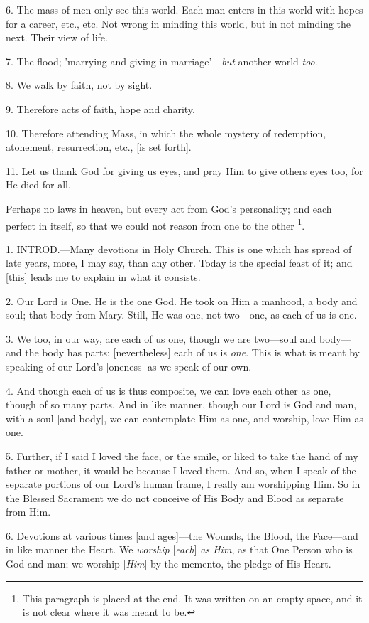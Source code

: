 6. The mass of men only see this world. Each
man enters in this world with hopes for a career, etc., etc. Not
wrong in minding this world, but in not minding the next. Their view
of life.

7. The flood; 'marrying and giving in
marriage'—\emph{but} another world \emph{too}.

8. We walk by faith, not by sight.

9. Therefore acts of faith, hope and charity.

10. Therefore attending Mass, in which the whole
mystery of redemption, atonement, resurrection, etc., [is set forth].

11. Let us thank God for giving us eyes, and pray
Him to give others eyes too, for He died for all.

Perhaps no laws in heaven, but every act from God's
personality; and each perfect in itself, so that we could not reason
from one to the other \footnote{This paragraph is placed at the end. It was
written on an empty space, and it is not clear where it was meant to
be.}.


1. INTROD.—Many
devotions in Holy Church. This is one which has spread of late years,
more, I may say, than any other. Today is the special feast of it; and
[this] leads me to explain in what it consists.

2. Our Lord is One. He is the one God. He took on
Him a manhood, a body and soul; that body from Mary. Still, He was
one, not two—one, as each of us is one.

3. We too, in our way, are each of us one, though
we are two—soul and body—and the body has parts; [nevertheless] each of us is \emph{one}. This is what is meant by
speaking of our Lord's [oneness] as we speak of our own.

4. And though each of us is thus composite, we
can love each other as one, though of so many parts. And in like
manner, though our Lord is God and man, with a soul [and body], we can
contemplate Him as one, and worship, love Him as one.

5. Further, if I said I loved the face, or the
smile, or liked to take the hand of my father or mother, it would be
because I loved them. And so, when I speak of the separate portions of
our Lord's human frame, I really am worshipping Him. So in the Blessed
Sacrament we do not conceive of His Body and Blood as separate from
Him.

6. Devotions at various times [and ages]—the
Wounds, the Blood, the Face—and in like manner the Heart. We \emph{worship}
[\emph{each}] \emph{as Him}, as that One Person who is God and man; we
worship [\emph{Him}] by the memento, the pledge of His Heart.

